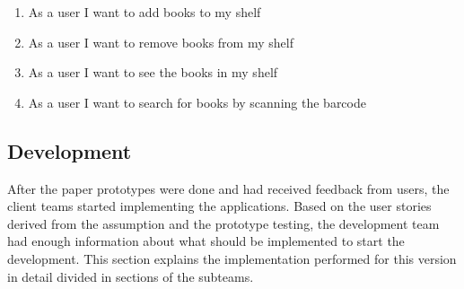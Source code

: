 \begin{enumerate}
  \item As a user I want to add books to my shelf
  \item As a user I want to remove books from my shelf
  \item As a user I want to see the books in my shelf \label{02-user-story-see-books-in-shelf}
  \item As a user I want to search for books by scanning the barcode 
  
\end{enumerate}


\subsection{Development}
After the paper prototypes were done and had received feedback from users, the client teams started implementing the applications. Based on the user stories derived from the assumption and the prototype testing, the development team had enough information about what should be implemented to start the development. This section explains the implementation performed for this version in detail divided in sections of the subteams. 

